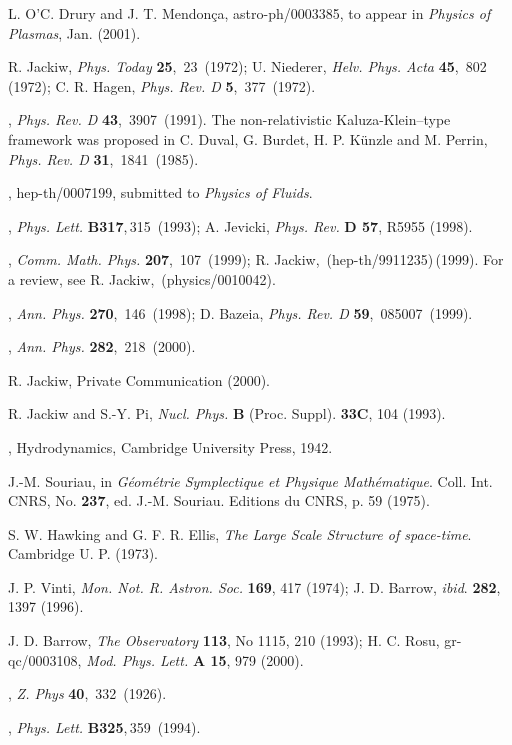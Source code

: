 \documentclass[11pt,a4paper]{article}
\begin{document}
\goodbreak
\begin{thebibliography}{2}


{\sc L. O'C. Drury and J. T. Mendon\c ca}, astro-ph/0003385,
to appear in {\em Physics of Plasmas}, Jan. (2001).

{\sc R. Jackiw}, {\em Phys. Today} {\bf 25},\, 23\,
(1972);
{\sc U. Niederer}, {\em Helv. Phys. Acta} {\bf 45},\,
802\, (1972);
{\sc C. R. Hagen}, {\em Phys. Rev. D} {\bf 5},\, 377\, (1972).

,
{\em Phys. Rev.  D} {\bf 43},\, 3907\, (1991).
The non-relativistic
Kaluza-Klein--type framework was  proposed in
{\sc C. Duval, G. Burdet, H. P. K\"{u}nzle and
M. Perrin}, {\em Phys. Rev. D} {\bf 31},\, 1841\, (1985).

,
hep-th/0007199, submitted to {\em Physics of Fluids}.

,
{\em Phys. Lett.} {\bf B317},\,315\, (1993);
{\sc A. Jevicki}, {\em Phys. Rev.} {\bf D 57}, R5955 (1998).

, {\em
Comm. Math. Phys.} {\bf 207},\, 107\, (1999); {\sc R. Jackiw},\,
(hep-th/9911235)\,(1999). For a review, see
{\sc R. Jackiw},\, (physics/0010042).

, {\em Ann. Phys.} {\bf
270},\, 146\, (1998);
{\sc D. Bazeia}, {\em Phys. Rev. D} {\bf 59},\, 085007\, (1999).

, {\em
Ann. Phys.} {\bf 282},\, 218\, (2000).

{\sc R. Jackiw}, Private Communication (2000).

{\sc R. Jackiw and S.-Y. Pi},
{\em Nucl. Phys.} {\bf B} (Proc. Suppl). {\bf 33C}, 104 (1993).

, Hydrodynamics, Cambridge University Press, 1942.


{\sc J.-M. Souriau}, in {\em G\'eom\'etrie Symplectique et Physique
Math\'ematique}. Coll. Int. CNRS,  No. {\bf 237},
ed. J.-M. Souriau. Editions du CNRS, p. 59 (1975).

{\sc S. W. Hawking and G. F. R. Ellis},
 {\em The Large Scale Structure of space-time}. Cambridge  U. P. (1973).

{\sc J. P. Vinti},
{\em Mon.  Not. R. Astron. Soc.} {\bf 169}, 417  (1974);
{\sc J. D. Barrow},
{\it ibid}. {\bf 282}, 1397 (1996).

{\sc J. D. Barrow},
{\em The Observatory} {\bf 113}, No 1115, 210 (1993);
{\sc H. C. Rosu},
gr-qc/0003108, {\em Mod. Phys. Lett.} {\bf A 15},  979 (2000).

, {\em Z. Phys} {\bf 40},\, 332\, (1926).

,
{\em Phys. Lett.} {\bf B325},\,359\, (1994).

\end{thebibliography}
\end{document}
